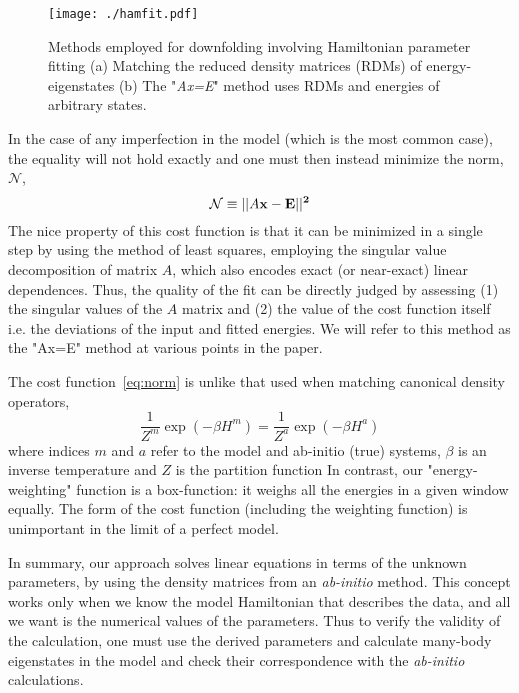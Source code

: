 \documentclass[aip,jcp,twocolumn,10pt]{revtex4-1}
\begin{document}
\begin{figure}[htpb]
\centering
\texttt{[image: ./hamfit.pdf]}
\caption{Methods employed for downfolding involving Hamiltonian parameter fitting (a) Matching 
the reduced density matrices (RDMs) of energy-eigenstates 
(b) The "\emph{Ax=E}" method uses RDMs and energies of arbitrary states. }
\label{fig:hamfit} 
\end{figure}	


In the case of any imperfection in the model (which is the most common case), 
the equality will not hold exactly 
and one must then instead minimize the norm, $\mathcal{N}$,
\begin{equation}
	\mathcal{N} \equiv ||A\bf{x}-\bf{E}||^2
\label{eq:norm}
\end{equation}
The nice property of this cost function is that it can be minimized
in a single step by using the method of least squares, employing the singular 
value decomposition of matrix $A$, which also encodes exact (or near-exact) linear dependences. 
Thus, the quality of the fit can be directly judged 
by assessing (1) the singular values of the $A$ matrix and (2) 
the value of the cost function itself i.e. the deviations of the input and fitted energies.
We will refer to this method as the "Ax=E" method at various points in the paper.

The cost function~\eqref{eq:norm} is unlike that used when matching 
canonical density operators,
\begin{equation} 
\frac{1} {Z^{m}} \exp(-\beta H^{m})  = \frac{1} {Z^{a}} \exp(-\beta H^{a})
\label{eq:Z_Zstar}
\end {equation}
where indices $m$ and $a$ refer to the model and ab-initio (true) systems, $\beta$ 
is an inverse temperature and $Z$ is the partition function
In contrast, our "energy-weighting" function is a box-function: it weighs all the energies 
in a given window equally. The form of the cost function (including the 
weighting function) is unimportant in the limit of a perfect model.

In summary, our approach solves 
linear equations in terms of the unknown parameters, by using the density matrices 
from an \emph{ab-initio} method. This concept works only when we 
know the model Hamiltonian that describes the data, and all we want is the numerical 
values of the parameters. Thus to verify the validity of the calculation, 
one must use the derived parameters and calculate many-body eigenstates 
in the model and check their correspondence with the \emph{ab-initio} 
calculations.
\end{document}
